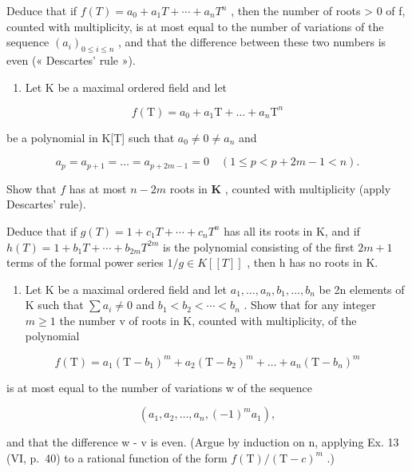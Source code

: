 Deduce that if \(f(T) = a_{0} + a_{1}T + \cdots + a_{n}T^{n}\) , then the number of roots \textgreater{} 0 of f, counted with multiplicity, is at most equal to the number of variations of the sequence \((a_{i})_{0 \leq i \leq n}\) , and that the difference between these two numbers is even (« Descartes' rule »).

\begin{enumerate}
\def\labelenumi{\arabic{enumi})}
\setcounter{enumi}{21}
\tightlist
\item
  Let K be a maximal ordered field and let
\end{enumerate}

\[
f (\mathrm{T}) = a _ {0} + a _ {1} \mathrm{T} + \dots + a _ {n} \mathrm{T} ^ {n}
\]

be a polynomial in K{[}T{]} such that \(a_0 \neq 0 \neq a_n\) and

\[
a _ {p} = a _ {p + 1} = \dots = a _ {p + 2 m - 1} = 0 \quad (1 \leqslant p <   p + 2 m - 1 <   n).
\]

Show that \(f\) has at most \(n - 2m\) roots in \(\mathbf{K}\) , counted with multiplicity (apply Descartes' rule).

Deduce that if \(g(T) = 1 + c_{1}T + \cdots + c_{n}T^{n}\) has all its roots in K, and if \(h(T) = 1 + b_{1}T + \cdots + b_{2m}T^{2m}\) is the polynomial consisting of the first \(2m + 1\) terms of the formal power series \(1/g \in K[[T]]\) , then h has no roots in K.

\begin{enumerate}
\def\labelenumi{\arabic{enumi})}
\setcounter{enumi}{22}
\tightlist
\item
  Let K be a maximal ordered field and let \(a_{1}, \ldots, a_{n}, b_{1}, \ldots, b_{n}\) be 2n elements of K such that \(\sum a_{i} \neq 0\) and \(b_{1} < b_{2} < \cdots < b_{n}\) . Show that for any integer \(m \geqslant 1\) the number v of roots in K, counted with multiplicity, of the polynomial
\end{enumerate}

\[
f (\mathrm{T}) = a _ {1} \left(\mathrm{T} - b _ {1}\right) ^ {m} + a _ {2} \left(\mathrm{T} - b _ {2}\right) ^ {m} + \dots + a _ {n} \left(\mathrm{T} - b _ {n}\right) ^ {m}
\]

is at most equal to the number of variations w of the sequence

\[
\left(a _ {1}, a _ {2}, \dots , a _ {n}, (- 1) ^ {m} a _ {1}\right),
\]

and that the difference w - v is even. (Argue by induction on n, applying Ex. 13 (VI, p.~40) to a rational function of the form \(f(\mathrm{T})/(\mathrm{T}-c)^{m}\) .)


